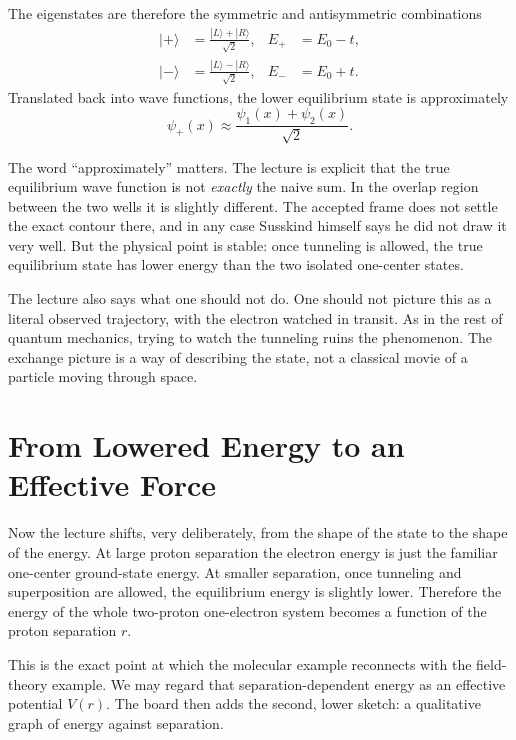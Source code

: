 The eigenstates are therefore the symmetric and antisymmetric combinations
\begin{align}
|+\rangle &= \frac{|L\rangle+|R\rangle}{\sqrt2},
&
E_+ &= E_0-t,
\\
|-\rangle &= \frac{|L\rangle-|R\rangle}{\sqrt2},
&
E_- &= E_0+t.
\end{align}
Translated back into wave functions, the lower equilibrium state is approximately
\begin{equation}
\psi_+(x)\approx \frac{\psi_1(x)+\psi_2(x)}{\sqrt2}.
\end{equation}

The word ``approximately'' matters. The lecture is explicit that the true equilibrium wave function is not \emph{exactly} the naive sum. In the overlap region between the two wells it is slightly different. The accepted frame does not settle the exact contour there, and in any case Susskind himself says he did not draw it very well. But the physical point is stable: once tunneling is allowed, the true equilibrium state has lower energy than the two isolated one-center states.

The lecture also says what one should not do. One should not picture this as a literal observed trajectory, with the electron watched in transit. As in the rest of quantum mechanics, trying to watch the tunneling ruins the phenomenon. The exchange picture is a way of describing the state, not a classical movie of a particle moving through space.

\section{From Lowered Energy to an Effective Force}

Now the lecture shifts, very deliberately, from the shape of the state to the shape of the energy. At large proton separation the electron energy is just the familiar one-center ground-state energy. At smaller separation, once tunneling and superposition are allowed, the equilibrium energy is slightly lower. Therefore the energy of the whole two-proton one-electron system becomes a function of the proton separation \(r\).

This is the exact point at which the molecular example reconnects with the field-theory example. We may regard that separation-dependent energy as an effective potential \(V(r)\). The board then adds the second, lower sketch: a qualitative graph of energy against separation.

